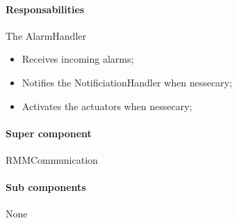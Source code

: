 \documentclass[a4paper,10pt]{article}
\begin{document}
\paragraph{Responsabilities} 
The AlarmHandler
\begin{itemize}
	\item Receives incoming alarms;
    \item Notifies the NotificiationHandler when nessecary;
    \item Activates the actuators when nessecary;
\end{itemize}

\paragraph{Super component} RMMCommunication

\paragraph{Sub components} None
\end{document}
